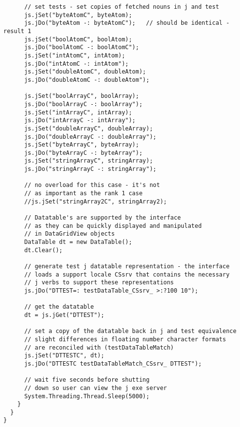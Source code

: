 \begin{tcolorbox}[breakable, size=fbox, boxrule=1pt, pad at break*=1mm,colback=cellbackground, colframe=cellborder]
\begin{lstlisting}
      // set tests - set copies of fetched nouns in j and test
      js.jSet("byteAtomC", byteAtom);
      js.jDo("byteAtom -: byteAtomC");   // should be identical - result 1
      js.jSet("boolAtomC", boolAtom);
      js.jDo("boolAtomC -: boolAtomC");
      js.jSet("intAtomC", intAtom);
      js.jDo("intAtomC -: intAtom");
      js.jSet("doubleAtomC", doubleAtom);
      js.jDo("doubleAtomC -: doubleAtom");

      js.jSet("boolArrayC", boolArray);
      js.jDo("boolArrayC -: boolArray");
      js.jSet("intArrayC", intArray);
      js.jDo("intArrayC -: intArray");
      js.jSet("doubleArrayC", doubleArray);
      js.jDo("doubleArrayC -: doubleArray");
      js.jSet("byteArrayC", byteArray);
      js.jDo("byteArrayC -: byteArray");
      js.jSet("stringArrayC", stringArray);
      js.jDo("stringArrayC -: stringArray");

      // no overload for this case - it's not
      // as important as the rank 1 case
      //js.jSet("stringArray2C", stringArray2);

      // Datatable's are supported by the interface
      // as they can be quickly displayed and manipulated
      // in DataGridView objects
      DataTable dt = new DataTable();
      dt.Clear();

      // generate test j datatable representation - the interface
      // loads a support locale CSsrv that contains the necessary
      // j verbs to support these representations
      js.jDo("DTTEST=: testDataTable_CSsrv_ >:?100 10");

      // get the datatable
      dt = js.jGet("DTTEST");

      // set a copy of the datatable back in j and test equivalence
      // slight differences in floating number character formats
      // are reconciled with (testDataTableMatch)
      js.jSet("DTTESTC", dt);
      js.jDo("DTTESTC testDataTableMatch_CSsrv_ DTTEST");

      // wait five seconds before shutting
      // down so user can view the j exe server
      System.Threading.Thread.Sleep(5000);
    }
  }
}
\end{lstlisting}
\lstset{style=resetdefaults}
\end{tcolorbox}




%
